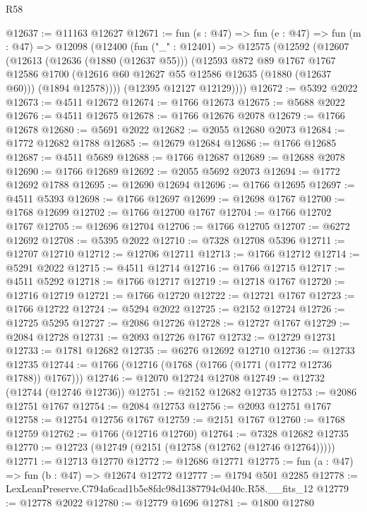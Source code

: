 \begin{lexlean}{R58}
\begin{coremodule}
@12637 := @11163 @12627
@12671 := fun (s : @47) =>
  fun (e : @47) =>
  fun (m : @47) =>
  @12098
    (@12400
      (fun ("_" : @12401) =>
      @12575
        (@12592
          (@12607
            (@12613
              (@12636 (@1880 (@12637 @55)))
              (@12593
                @872
                @89
                @1767
                @1767
                @12586
                @1700
                (@12616 @60 @12627 @55 @12586 @12635 (@1880 (@12637 @60)))
                (@1894 @12578))))
          (@12395 @12127 @12129))))
@12672 := @5392 @2022
@12673 := @4511 @12672
@12674 := @1766 @12673
@12675 := @5688 @2022
@12676 := @4511 @12675
@12678 := @1766 @12676 @2078
@12679 := @1766 @12678
@12680 := @5691 @2022
@12682 := @2055 @12680 @2073
@12684 := @1772 @12682 @1788
@12685 := @12679 @12684
@12686 := @1766 @12685
@12687 := @4511 @5689
@12688 := @1766 @12687
@12689 := @12688 @2078
@12690 := @1766 @12689
@12692 := @2055 @5692 @2073
@12694 := @1772 @12692 @1788
@12695 := @12690 @12694
@12696 := @1766 @12695
@12697 := @4511 @5393
@12698 := @1766 @12697
@12699 := @12698 @1767
@12700 := @1768 @12699
@12702 := @1766 @12700 @1767
@12704 := @1766 @12702 @1767
@12705 := @12696 @12704
@12706 := @1766 @12705
@12707 := @6272 @12692
@12708 := @5395 @2022
@12710 := @7328 @12708 @5396
@12711 := @12707 @12710
@12712 := @12706 @12711
@12713 := @1766 @12712
@12714 := @5291 @2022
@12715 := @4511 @12714
@12716 := @1766 @12715
@12717 := @4511 @5292
@12718 := @1766 @12717
@12719 := @12718 @1767
@12720 := @12716 @12719
@12721 := @1766 @12720
@12722 := @12721 @1767
@12723 := @1766 @12722
@12724 := @5294 @2022
@12725 := @2152 @12724
@12726 := @12725 @5295
@12727 := @2086 @12726
@12728 := @12727 @1767
@12729 := @2084 @12728
@12731 := @2093 @12726 @1767
@12732 := @12729 @12731
@12733 := @1781 @12682
@12735 := @6276 @12692 @12710
@12736 := @12733 @12735
@12744 := @1766 (@12716 (@1768 (@1766 (@1771 (@1772 @12736 @1788)) @1767)))
@12746 := @12070 @12724 @12708
@12749 := @12732 (@12744 (@12746 @12736))
@12751 := @2152 @12682 @12735
@12753 := @2086 @12751 @1767
@12754 := @2084 @12753
@12756 := @2093 @12751 @1767
@12758 := @12754 @12756 @1767
@12759 := @2151 @1767
@12760 := @1768 @12759
@12762 := @1766 (@12716 @12760)
@12764 := @7328 @12682 @12735
@12770 := @12723 (@12749 (@2151 (@12758 (@12762 (@12746 @12764)))))
@12771 := @12713 @12770
@12772 := @12686 @12771
@12775 := fun (a : @47) => fun (b : @47) => @12674 @12772
@12777 := @1794 @501 @2285
@12778 := LexLeanPreserve.C794a6cad1b5e8fdc98d1387794c0d40c.R58.__fits_12
@12779 := @12778 @2022
@12780 := @12779 @1696
@12781 := @1800 @12780

\end{coremodule}
\end{lexlean}
